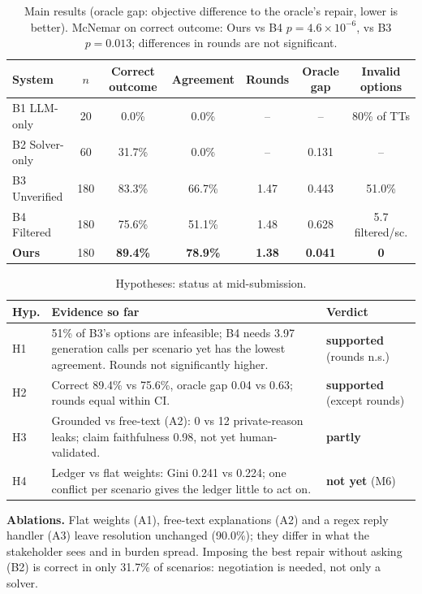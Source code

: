 \documentclass[11pt,a4paper]{article}
\newcommand{\yes}{{\color{goodgreen}\textbf{supported}}}
\newcommand{\partly}{{\color{gaporange}\textbf{partly}}}
\newcommand{\no}{{\color{badred}\textbf{not yet}}}
\newcommand{\best}[1]{\textbf{#1}}
\begin{document}
\begin{table}[H]
\centering\small
\begin{tabularx}{\textwidth}{@{}l c C C C C C@{}}
\toprule
\textbf{System} & \textbf{$n$} & \textbf{Correct outcome} & \textbf{Agreement} & \textbf{Rounds} & \textbf{Oracle gap} & \textbf{Invalid options}\\
\midrule
B1 LLM-only & 20 & 0.0\% & 0.0\% & -- & -- & 80\% of TTs\\
B2 Solver-only & 60 & 31.7\% & 0.0\% & -- & 0.131 & --\\
B3 Unverified & 180 & 83.3\% & 66.7\% & 1.47 & 0.443 & 51.0\%\\
B4 Filtered & 180 & 75.6\% & 51.1\% & 1.48 & 0.628 & 5.7 filtered/sc.\\
\textbf{Ours} & 180 & \best{89.4\%} & \best{78.9\%} & \best{1.38} & \best{0.041} & \best{0}\\
\bottomrule
\end{tabularx}
\caption{Main results (oracle gap: objective difference to the oracle's repair, lower is
better). McNemar on correct outcome: Ours vs B4 $p{=}4.6{\times}10^{-6}$, vs B3 $p{=}0.013$;
differences in rounds are not significant.}
\label{tab:main}
\end{table}

\begin{table}[H]
\centering\small
\begin{tabularx}{\textwidth}{@{}l Y l@{}}
\toprule
\textbf{Hyp.} & \textbf{Evidence so far} & \textbf{Verdict}\\
\midrule
H1 & 51\% of B3's options are infeasible; B4 needs 3.97 generation calls per scenario yet has the lowest agreement. Rounds not significantly higher. & \yes{} (rounds n.s.)\\
H2 & Correct 89.4\% vs 75.6\%, oracle gap 0.04 vs 0.63; rounds equal within CI. & \yes{} (except rounds)\\
H3 & Grounded vs free-text (A2): 0 vs 12 private-reason leaks; claim faithfulness 0.98, not yet human-validated. & \partly{}\\
H4 & Ledger vs flat weights: Gini 0.241 vs 0.224; one conflict per scenario gives the ledger little to act on. & \no{} (M6)\\
\bottomrule
\end{tabularx}
\caption{Hypotheses: status at mid-submission.}
\end{table}

\noindent\textbf{Ablations.} Flat weights (A1), free-text explanations (A2) and a regex reply
handler (A3) leave resolution unchanged (90.0\%); they differ in what the stakeholder sees
and in burden spread. Imposing the best repair without asking (B2) is correct in only
31.7\% of scenarios: negotiation is needed, not only a solver.
\end{document}
